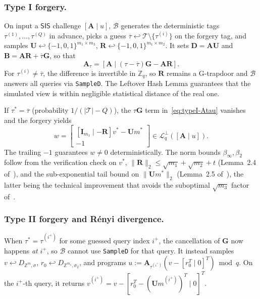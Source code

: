 \documentclass[a4paper]{article}
\begin{document}
\subsubsection{Type I forgery.}
On input a $\mathsf{SIS}$ challenge $[\mathbf{A}\mid u]$, $\mathcal{B}$
generates the deterministic tags
$\tau^{(1)},\dots,\tau^{(Q)}$ in advance, picks a guess
$\overline{\tau} \hookleftarrow \mathcal{T}\setminus\{\tau^{(i)}\}$ on the
forgery tag, and samples
$\mathbf{U} \hookleftarrow \{-1,0,1\}^{m_1\times m_3}$,
$\mathbf{R} \hookleftarrow \{-1,0,1\}^{m_1\times m_2}$. It sets
$\mathbf{D}=\mathbf{A}\mathbf{U}$ and
$\mathbf{B}=\mathbf{A}\mathbf{R}+\overline{\tau}\mathbf{G}$, so that
\begin{equation}\label{eq:typeI-Atau}
\mathbf{A}_\tau = [\mathbf{A}\mid (\tau-\overline{\tau})\mathbf{G}-\mathbf{A}\mathbf{R}].
\end{equation}
For $\tau^{(i)}\neq\overline{\tau}$, the difference is invertible in
$\mathbb{Z}_q$, so $\mathbf{R}$ remains a G-trapdoor and $\mathcal{B}$ answers
all queries via \texttt{SampleD}. The Leftover Hash Lemma guarantees that the
simulated view is within negligible statistical distance of the real one.

If $\tau^* = \overline{\tau}$ (probability $1/(|\mathcal{T}|-Q)$), the
$\tau\mathbf{G}$ term in~\eqref{eq:typeI-Atau} vanishes and the forgery yields
\[
w = \begin{bmatrix}[\mathbf{I}_{m_1}\mid -\mathbf{R}]v^* - \mathbf{U}m^*\\ -1\end{bmatrix}
\in \mathcal{L}_q^\perp([\mathbf{A}\mid u]).
\]
The trailing $-1$ guarantees $w\neq 0$ deterministically. The norm bounds
$\beta_\infty,\beta_2$ follow from the verification check on $v^*$,
$\|\mathbf{R}\|_2 \leq \sqrt{m_1}+\sqrt{m_2}+t$ (Lemma~2.4
of~\cite{mainPaper}), and the sub-exponential tail bound on $\|\mathbf{U}m^*\|_2$
(Lemma~2.5 of~\cite{mainPaper}), the latter being the technical improvement
that avoids the suboptimal $\sqrt{m_3}$ factor of~\cite{LLM+16}.

\subsubsection{Type II forgery and R\'enyi divergence.}
When $\tau^* = \tau^{(i^+)}$ for some guessed query index $i^+$, the
cancellation of $\mathbf{G}$ now happens \emph{at} $i^+$, so $\mathcal{B}$
cannot use \texttt{SampleD} for that query. It instead samples
$v \hookleftarrow D_{\mathbb{Z}^m,\sigma}$,
$r_0 \hookleftarrow D_{\mathbb{Z}^{m_1},\sigma_2}$, and programs
$u := \mathbf{A}_{\tau^{(i^+)}}(v - [r_0^T \mid 0]^T) \bmod q$. On the $i^+$-th
query, it returns $v^{(i^+)} = v - [r_0^T - (\mathbf{U}m^{(i^+)})^T \mid 0]^T$.
\end{document}

